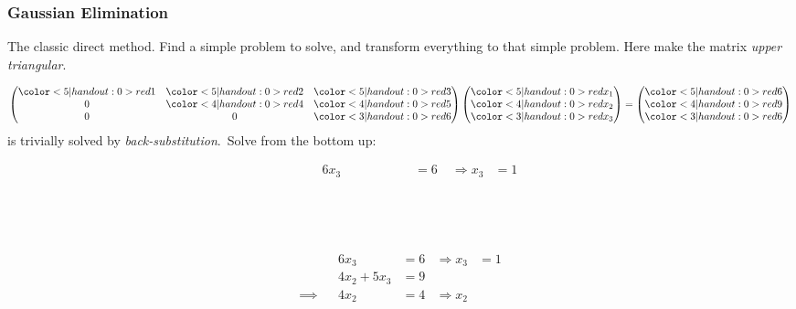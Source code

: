 \documentclass{beamer}
\begin{document}
\begin{frame}
  \frametitle{Gaussian Elimination}
  
  The classic direct method.  Find a simple problem to solve, and
  transform everything to that simple problem. Here make the matrix
  \emph{upper triangular}. \pause

  \begin{equation*}
    \begin{pmatrix}
      \color<5|handout:0>{red}1 & \color<5|handout:0>{red}2 & \color<5|handout:0>{red}3 \\
      0 & \color<4|handout:0>{red}4 & \color<4|handout:0>{red}5 \\
      0 & 0 & \color<3|handout:0>{red}6
    \end{pmatrix}
    \begin{pmatrix}
      \color<5|handout:0>{red}x_1 \\ \color<4|handout:0>{red}x_2 \\ \color<3|handout:0>{red}x_3
    \end{pmatrix}
    =
    \begin{pmatrix}
      \color<5|handout:0>{red}6 \\ \color<4|handout:0>{red}9 \\ \color<3|handout:0>{red}6
    \end{pmatrix}
  \end{equation*}
  is trivially solved by \emph{back-substitution}.\pause\ Solve from
  the bottom up:
  \begin{overlayarea}{\textwidth}{0.35\textheight}
    {
      \begin{align*}
        && {6 x_3} & {= 6} & {\Rightarrow x_3} & {= 1} \\
        && \phantom{4 x_2 + 5 x_3} & \phantom{= 9} && \\
        \phantom{\implies} && \phantom{4 x_2} & \phantom{= 4} & \phantom{\Rightarrow x_2} & \phantom{= 1} \\
        && \phantom{x_1 + 2 x_2 + 3 x_3} & \phantom{= 6} && \\
        \phantom{\implies} && \phantom{x_1} & \phantom{= 1.}
      \end{align*}
    }
    {
      \begin{align*}
        && { 6 x_3 } & { = 6 } & { \Rightarrow x_3 } & { = 1 } \\
        && { 4 x_2 + 5 x_3 } & { = 9 } && \\
        { \implies } && { 4 x_2 } & { = 4 } & { \Rightarrow x_2 } & {
}
\end{align*}}
\end{overlayarea}
\end{frame}
\end{document}

